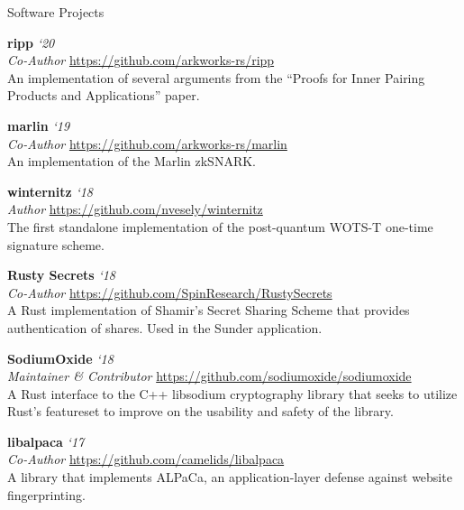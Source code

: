 \documentclass{cv}
\begin{document}

\begin{rSection}{Software Projects}

\textbf{ripp} \hfill \emph{`20} \\
\emph{Co-Author} \hfill \url{https://github.com/arkworks-rs/ripp} \\
{\small An implementation of several arguments from the ``Proofs for Inner Pairing Products and Applications'' paper.}

\textbf{marlin} \hfill \emph{`19} \\
\emph{Co-Author} \hfill \url{https://github.com/arkworks-rs/marlin} \\
{\small An implementation of the Marlin zkSNARK.}

\textbf{winternitz} \hfill \emph{`18} \\
\emph{Author} \hfill \url{https://github.com/nvesely/winternitz} \\
{\small The first standalone implementation of the post-quantum WOTS-T one-time signature scheme.}

\textbf{Rusty Secrets} \hfill \emph{`18} \\
\emph{Co-Author} \hfill \url{https://github.com/SpinResearch/RustySecrets} \\
{\small A Rust implementation of Shamir's Secret Sharing Scheme that provides authentication of shares. Used in the Sunder application.}

\textbf{SodiumOxide} \hfill \emph{`18} \\
\emph{Maintainer \& Contributor} \hfill \url{https://github.com/sodiumoxide/sodiumoxide} \\
{\small A Rust interface to the C++ libsodium cryptography library that seeks to utilize Rust's featureset to improve on the usability and safety of the library.}

\textbf{libalpaca} \hfill \emph{`17} \\
\emph{Co-Author} \hfill \url{https://github.com/camelids/libalpaca}\\
{\small A library that implements ALPaCa, an application-layer defense against website fingerprinting.}

\end{rSection}


\end{document}
